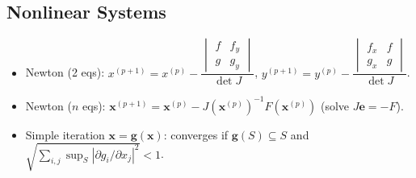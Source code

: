 \documentclass[hidelinks]{article}
\newcommand{\abs}[1]{\left|#1\right|}
\begin{document}
\subsection{Nonlinear Systems}
\begin{itemize}
    \item Newton (2 eqs): $x^{(p+1)}=x^{(p)}-\dfrac{\begin{vmatrix}f&f_y\\g&g_y\end{vmatrix}}{\det J}$, $y^{(p+1)}=y^{(p)}-\dfrac{\begin{vmatrix}f_x&f\\g_x&g\end{vmatrix}}{\det J}$.
    \item Newton ($n$ eqs): $\mathbf x^{(p+1)}=\mathbf x^{(p)}-J(\mathbf x^{(p)})^{-1}F(\mathbf x^{(p)})$ (solve $J\mathbf e=-F$).
    \item Simple iteration $\mathbf x=\mathbf g(\mathbf x)$: converges if $\mathbf g(S)\subseteq S$ and $\sqrt{\sum_{i,j}\sup_S\abs{\partial g_i/\partial x_j}^2}<1$.
\end{itemize}
\end{document}
